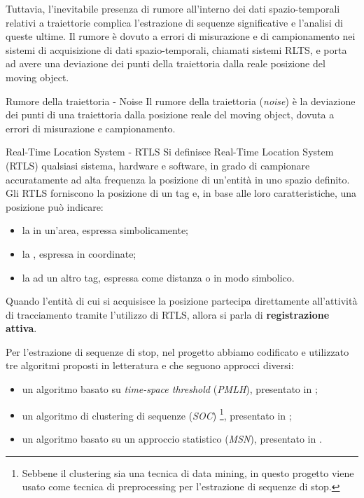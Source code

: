 \documentclass[12pt]{article}
\begin{document}
Tuttavia, l'inevitabile presenza di rumore all'interno dei dati spazio-temporali relativi a traiettorie complica l'estrazione di sequenze significative e l'analisi di queste ultime.
Il rumore è dovuto a errori di misurazione e di campionamento nei sistemi di acquisizione di dati spazio-temporali, chiamati sistemi RLTS, e porta ad avere una deviazione dei punti della traiettoria dalla reale posizione del moving object.
\begin{definition}{Rumore della traiettoria - Noise}{}
    Il rumore della traiettoria (\emph{noise}) è la deviazione dei punti di una traiettoria dalla posizione reale del moving object, dovuta a errori di misurazione e campionamento.
\end{definition}
\begin{definition}{Real-Time Location System - RTLS}{}
    Si definisce Real-Time Location System (RTLS) qualsiasi sistema, hardware e software, in grado di campionare accuratamente ad alta frequenza la posizione di un'entità in uno spazio definito.\\
    Gli RTLS forniscono la posizione di un tag e, in base alle loro caratteristiche, una posizione può indicare:
    \begin{itemize}
        \item la  in un'area, espressa simbolicamente;
        \item la , espressa in coordinate;
        \item la  ad un altro tag, espressa come distanza o in modo simbolico.
    \end{itemize}
    Quando l'entità di cui si acquisisce la posizione partecipa direttamente all'attività di tracciamento tramite l'utilizzo di RTLS, allora si parla di \textbf{registrazione attiva}.
\end{definition}
Per l'estrazione di sequenze di stop, nel progetto abbiamo codificato e utilizzato tre algoritmi proposti in letteratura e che seguono approcci diversi:
\begin{itemize}
    \item un algoritmo basato su \emph{time-space threshold} (\emph{PMLH}), presentato in \cite{SpaceTimeTreshold};
    \item un algoritmo di clustering di sequenze (\emph{SOC}) \footnote{Sebbene il clustering sia una tecnica di data mining, in questo progetto viene usato come tecnica di preprocessing per l'estrazione di sequenze di stop.}, presentato in \cite{SequenceClustering};
    \item un algoritmo basato su un approccio statistico (\emph{MSN}), presentato in \cite{Statistical}.
\end{itemize}
\end{document}
